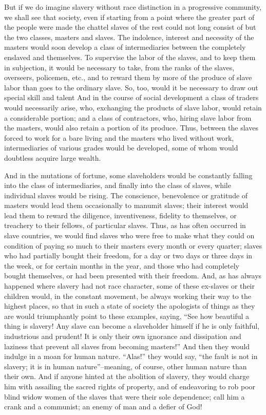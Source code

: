\documentclass{book}
\begin{document}
But if we do imagine slavery without race distinction in a progressive community, we shall see that society, even if starting from a point where the greater part of the people were made the chattel slaves of the rest could not long consist of but the two classes, masters and slaves. The indolence, interest and necessity of the masters would soon develop a class of intermediaries between the completely enslaved and themselves. To supervise the labor of the slaves, and to keep them in subjection, it would be necessary to take, from the ranks of the slaves, overseers, policemen, etc., and to reward them by more of the produce of slave labor than goes to the ordinary slave. So, too, would it be necessary to draw out special skill and talent And in the course of social development a class of traders would necessarily arise, who, exchanging the products of slave labor, would retain a considerable portion; and a class of contractors, who, hiring slave labor from the masters, would also retain a portion of its produce. Thus, between the slaves forced to work for a bare living and the masters who lived without work, intermediaries of various grades would be developed, some of whom would doubtless acquire large wealth.

And in the mutations of fortune, some slaveholders would be constantly falling into the class of intermediaries, and finally into the class of slaves, while individual slaves would be rising. The conscience, benevolence or gratitude of masters would lead them occasionally to manumit slaves; their interest would lead them to reward the diligence, inventiveness, fidelity to themselves, or treachery to their fellows, of particular slaves. Thus, as has often occurred in slave countries, we would find slaves who were free to make what they could on condition of paying so much to their masters every month or every quarter; slaves who had partially bought their freedom, for a day or two days or three days in the week, or for certain months in the year, and those who had completely bought themselves, or had been presented with their freedom. And, as has always happened where slavery had not race character, some of these ex-slaves or their children would, in the constant movement, be always working their way to the highest places, so that in such a state of society the apologists of things as they are would triumphantly point to these examples, saying, “See how beautiful a thing is slavery! Any slave can become a slaveholder himself if he is only faithful, industrious and prudent! It is only their own ignorance and dissipation and laziness that prevent all slaves from becoming masters!” And then they would indulge in a moan for human nature. “Alas!” they would say, “the fault is not in slavery; it is in human nature”–meaning, of course, other human nature than their own. And if anyone hinted at the abolition of slavery, they would charge him with assailing the sacred rights of property, and of endeavoring to rob poor blind widow women of the slaves that were their sole dependence; call him a crank and a communist; an enemy of man and a defier of God!
\end{document}
